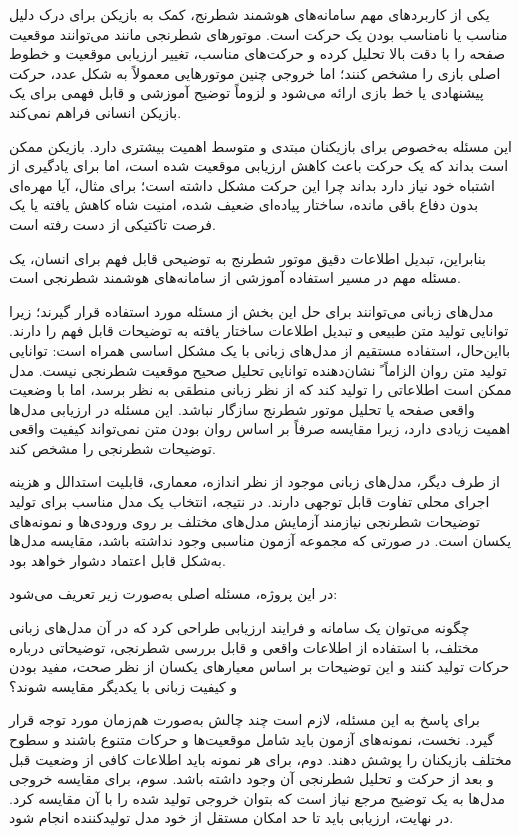 یکی از کاربردهای مهم سامانه‌های هوشمند شطرنج، کمک به بازیکن برای درک دلیل مناسب یا نامناسب بودن یک حرکت است. موتورهای شطرنجی مانند  می‌توانند موقعیت صفحه را با دقت بالا تحلیل کرده و حرکت‌های مناسب، تغییر ارزیابی موقعیت و خطوط اصلی بازی را مشخص کنند؛ اما خروجی چنین موتورهایی معمولاً به شکل عدد، حرکت پیشنهادی یا خط بازی ارائه می‌شود و لزوماً توضیح آموزشی و قابل فهمی برای یک بازیکن انسانی فراهم نمی‌کند.

این مسئله به‌خصوص برای بازیکنان مبتدی و متوسط اهمیت بیشتری دارد. بازیکن ممکن است بداند که یک حرکت باعث کاهش ارزیابی موقعیت شده است، اما برای یادگیری از اشتباه خود نیاز دارد بداند چرا این حرکت مشکل داشته است؛ برای مثال، آیا مهره‌ای بدون دفاع باقی مانده، ساختار پیاده‌ای ضعیف شده، امنیت شاه کاهش یافته یا یک فرصت تاکتیکی از دست رفته است.

بنابراین، تبدیل اطلاعات دقیق موتور شطرنج به توضیحی قابل فهم برای انسان، یک مسئله مهم در مسیر استفاده آموزشی از سامانه‌های هوشمند شطرنجی است.

مدل‌های زبانی می‌توانند برای حل این بخش از مسئله مورد استفاده قرار گیرند؛ زیرا توانایی تولید متن طبیعی و تبدیل اطلاعات ساختار یافته به توضیحات قابل فهم را دارند. بااین‌حال، استفاده مستقیم از مدل‌های زبانی با یک مشکل اساسی همراه است: توانایی تولید متن روان الزاماً ً نشان‌دهنده توانایی تحلیل صحیح موقعیت شطرنجی نیست. مدل ممکن است اطلاعاتی را تولید کند که از نظر زبانی منطقی به نظر برسد، اما با وضعیت واقعی صفحه یا تحلیل موتور شطرنج سازگار نباشد. این مسئله در ارزیابی مدل‌ها اهمیت زیادی دارد، زیرا مقایسه صرفاً بر اساس روان بودن متن نمی‌تواند کیفیت واقعی توضیحات شطرنجی را مشخص کند.

از طرف دیگر، مدل‌های زبانی موجود از نظر اندازه، معماری، قابلیت استدالل و هزینه اجرای محلی تفاوت قابل توجهی دارند. در نتیجه، انتخاب یک مدل مناسب برای تولید توضیحات شطرنجی نیازمند آزمایش مدل‌های مختلف بر روی ورودی‌ها و نمونه‌های یکسان است. در صورتی که مجموعه آزمون مناسبی وجود نداشته باشد، مقایسه مدل‌ها به‌شکل قابل اعتماد دشوار خواهد بود.

در این پروژه، مسئله اصلی به‌صورت زیر تعریف می‌شود:

چگونه می‌توان یک سامانه و فرایند ارزیابی طراحی کرد که در آن مدل‌های زبانی مختلف، با استفاده از اطلاعات واقعی و قابل بررسی شطرنجی، توضیحاتی درباره حرکات تولید کنند و این توضیحات بر اساس معیارهای یکسان از نظر صحت، مفید بودن و کیفیت زبانی با یکدیگر مقایسه شوند؟

برای پاسخ به این مسئله، لازم است چند چالش به‌صورت هم‌زمان مورد توجه قرار گیرد. نخست، نمونه‌های آزمون باید شامل موقعیت‌ها و حرکات متنوع باشند و سطوح مختلف بازیکنان را پوشش دهند. دوم، برای هر نمونه باید اطلاعات کافی از وضعیت قبل و بعد از حرکت و تحلیل شطرنجی آن وجود داشته باشد. سوم، برای مقایسه خروجی مدل‌ها به یک توضیح مرجع نیاز است که بتوان خروجی تولید شده را با آن مقایسه کرد. در نهایت، ارزیابی باید تا حد امکان مستقل از خود مدل تولیدکننده انجام شود.


